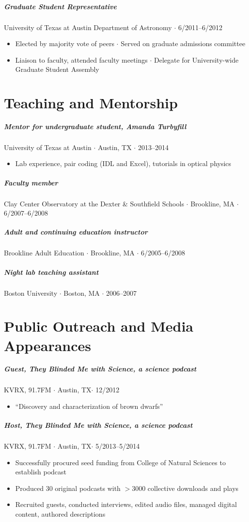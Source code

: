 \documentclass[10pt,letterpaper]{article}
\begin{document}
\subparagraph{Graduate Student Representative}
University of Texas at Austin Department of Astronomy $\cdot$ 6/2011--6/2012
\begin{itemize}
    \item Elected by majority vote of peers $\cdot$ Served on graduate admissions committee
    \item Liaison to faculty, attended faculty meetings $\cdot$ Delegate for University-wide Graduate Student Assembly
\end{itemize}

\section*{Teaching and Mentorship}

\subparagraph{Mentor for undergraduate student, Amanda Turbyfill} 
University of Texas at Austin $\cdot$ Austin, TX $\cdot$ 2013--2014
	\begin{itemize}
	    \item Lab experience, pair coding (IDL and Excel), tutorials in optical physics
	\end{itemize}

\subparagraph{Faculty member}
Clay Center Observatory at the Dexter \& Southfield Schools  $\cdot$ Brookline, MA $\cdot$ 6/2007--6/2008

\subparagraph{Adult and continuing education instructor}
Brookline Adult Education  $\cdot$ Brookline, MA $\cdot$ 6/2005--6/2008

\subparagraph{Night lab teaching assistant} 
Boston University $\cdot$ Boston, MA $\cdot$ 2006--2007

\section*{Public Outreach and Media Appearances}

\subparagraph{Guest, They Blinded Me with Science, a science podcast}
KVRX, 91.7FM $\cdot$ Austin, TX$\cdot$ 12/2012
	\begin{itemize}
	    \item ``Discovery and characterization of brown dwarfs''
	\end{itemize}
	
\subparagraph{Host, They Blinded Me with Science, a science podcast}
KVRX, 91.7FM $\cdot$ Austin, TX$\cdot$ 5/2013--5/2014
	\begin{itemize}
	    \item Successfully procured seed funding from College of Natural Sciences to establish podcast
	    \item Produced 30 original podcasts with $>3000$ collective downloads and plays
	    \item Recruited guests, conducted interviews, edited audio files, managed digital content, authored descriptions
	\end{itemize}
\end{document}
